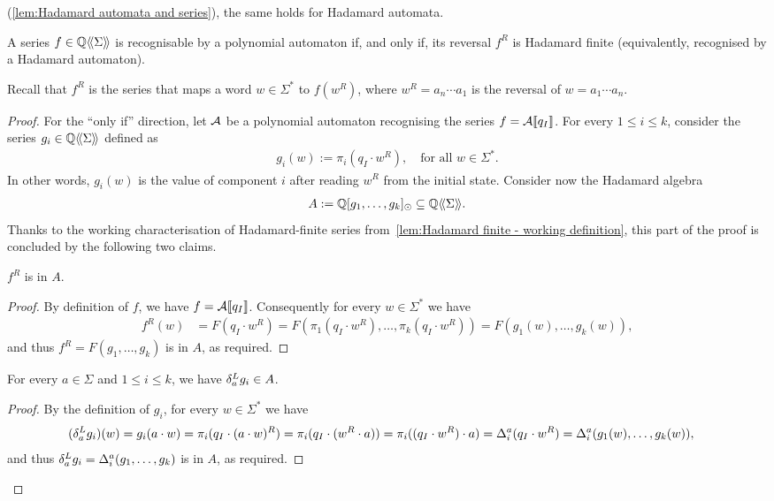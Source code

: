 (\cref{lem:Hadamard automata and series}),
the same holds for Hadamard automata.
%
\begin{lemma}
    A series $f \in \series \Q \Sigma$ is recognisable by a polynomial automaton
    if, and only if, its reversal $f^R$ is Hadamard finite
    (equivalently, recognised by a Hadamard automaton).
\end{lemma}
%
\noindent
Recall that $f^R$ is the series that maps a word $w \in \Sigma^*$ to $f(w^R)$,
where $w^R = a_n \cdots a_1$ is the reversal of $w = a_1 \cdots a_n$.
%
\begin{proof}
    For the ``only if'' direction,
    let $\AA$ be a polynomial automaton recognising
    the series $f = \Asem \AA {q_I}$.
    For every $1 \leq i \leq k$,
    consider the series $g_i \in \series \Q \Sigma$ defined as
    \begin{align*}
        g_i(w) := \pi_i(q_I \cdot w^R),
        \quad \text{for all } w \in \Sigma^*.
    \end{align*}
    In other words, $g_i(w)$ is the value of component $i$
    after reading $w^R$ from the initial state.
    Consider now the Hadamard algebra
    \begin{align*}
        A := \poly \Q {g_1, \dots, g_k}_{\hadamard} \subseteq \series \Q \Sigma.
    \end{align*}
    Thanks to the working characterisation of Hadamard-finite series from~\cref{lem:Hadamard finite - working definition},
    this part of the proof is concluded by the following two claims.
    \begin{claim*}
        $f^R$ is in $A$.
    \end{claim*}
    \begin{proof}
        By definition of $f$, we have $f = \Asem \AA {q_I} {}$.
        Consequently for every $w \in \Sigma^*$ we have
        \begin{align*}
            f^R(w)
                &= F(q_I \cdot w^R)
                = F(\pi_1(q_I \cdot w^R), \dots, \pi_k(q_I \cdot w^R))
                = F(g_1(w), \dots, g_k(w)),
        \end{align*}
        and thus $f^R = F(g_1, \dots, g_k)$ is in $A$,
        as required.
    \end{proof}

    \begin{claim*}
        For every $a \in \Sigma$ and $1 \leq i \leq k$,
        we have $\deriveleft a g_i \in A$.
    \end{claim*}
    \begin{proof}
        By the definition of $g_i$, for every $w \in \Sigma^*$ we have
        \begin{align*}
            (\deriveleft a g_i)(w)
                &= g_i(a \cdot w)
                = \pi_i(q_I \cdot (a \cdot w)^R)
                = \pi_i(q_I \cdot (w^R \cdot a))
                = \pi_i((q_I \cdot w^R) \cdot a)
                = \Delta^a_i(q_I \cdot w^R)
                = \Delta^a_i(g_1(w), \dots, g_k(w)),
        \end{align*}
        and thus $\deriveleft a g_i = \Delta^a_i(g_1, \dots, g_k)$
        is in $A$, as required.
    \end{proof}


\end{proof}
